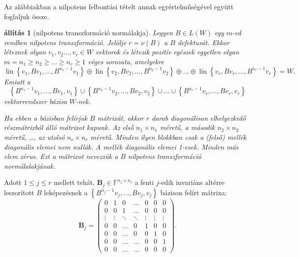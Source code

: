 \documentclass[9pt, a4paper, showtrims]{memoir}
\theoremstyle{plain}
\newtheorem{proposition}{állítás}[chapter]
\theoremstyle{remark}
\theoremstyle{definition}
\DeclareMathOperator{\lin}{lin}
\begin{document}
Az alábbiakban a nilpotens felbontási tételt annak egyértelműségével együtt foglaljuk össze.
\begin{proposition}[nilpotens transzformáció normálakja]\label{pr:nilpnormal}
	Legyen $B\in L\left( W \right)$ egy $m$-ed rendben nilpotens transzformáció.
	Jelölje $r=\nu\left( B \right)$ a $B$ defektusát.
	Ekkor léteznek olyan $v_1,v_2\dots,v_r\in W$ vektorok és
	létezik pozitív egészek egyetlen olyan $m=n_1\geq n_2\geq \dots\geq n_r\geq 1$ véges sorozata,
	amelyekre
	\[
		\lin\left\{ v_1,Bv_1,\ldots,B^{n_1-1}v_1 \right\}
		\oplus
		\lin\left\{ v_2,Bv_2,\ldots,B^{n_2-1}v_2 \right\}
		\oplus
		\ldots
		\oplus
		\lin\left\{ v_r,Bv_r,\ldots,B^{n_r-1}v_r \right\}
		=
		W.
	\]
	Emiatt a
	\[
		\left\{ B^{n_1-1}v_1,\ldots,Bv_1,v_1 \right\}
		\cup
		\left\{ B^{n_2-1}v_2,\ldots,Bv_2,v_2 \right\}
		\cup
		\ldots
		\cup
		\left\{ B^{n_r-1}v_r,\ldots,Bv_r,v_r \right\}
		\tag{\dag}
	\]
	vektorrendszer bázisa $W$-nek.

	Ha ebben a bázisban felírjuk $B$ mátrixát,
	akkor $r$ darab diagonálisan elhelyezkedő részmátrixból álló mátrixot kapunk.
	Az első $n_1\times n_1$ méretű,
	a második $n_2\times n_2$ méretű, \dots, az utolsó $n_r\times n_r$ méretű.
	Minden ilyen blokkban csak a (felső) mellék diagonális elemei nem nullák.
	A mellék diagonális elemei 1-esek.
	Minden más elem zérus.
	Ezt a mátrixot nevezzük a $B$ nilpotens transzformáció \emph{normálalakjának}.
\end{proposition}
Adott $1\leq j\leq r$ mellett tehát, $\mathbf{B}_j\in \mathbb{F}^{n_j\times n_j}$
a fenti $j$-edik invariáns altérre leszorított $B$ leképezésnek a
\begin{math}
	\left\{ B^{n_j-1}v_j,\ldots,Bv_j,v_j \right\}
\end{math}
bázison felírt mátrixa:
\[
	\mathbf{B}_j
	=
	\begin{pmatrix}
		0      & 1      & 0      & \dots  & 0      & 0      & 0      \\
		0      & 0      & 1      & \dots  & 0      & 0      & 0      \\
		\vdots & \vdots & \ddots & \ddots & \vdots & \vdots & \vdots \\
		0      & 0      & \dots  & 0      & 1      & 0      & 0      \\
		0      & 0      & \dots  & 0      & 0      & 1      & 0      \\
		0      & 0      & \dots  & \dots  & 0      & 0      & 1      \\
		0      & 0      & \dots  & \dots  & 0      & 0      & 0
	\end{pmatrix}.
\]
\end{document}
